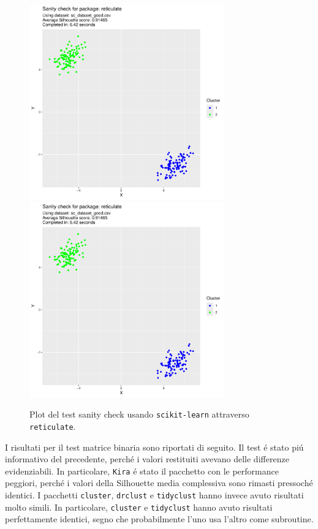 \documentclass[12pt]{report}
\begin{document}
			\begin{figure}[h]
				\centering
				\includegraphics[width = 0.75\textwidth, height = 0.45\textheight, page = 1]{results/results_RETICULATE.pdf}
				\includegraphics[width = 0.75\textwidth, height = 0.45\textheight, page = 2]{results/results_RETICULATE.pdf}
				\caption{Plot del test sanity check usando \texttt{scikit-learn} attraverso
				\texttt{reticulate}.}
				\label{fig:reticulate}
			\end{figure}

			I risultati per il test matrice binaria sono riportati
			di seguito. Il test é stato piú informativo del precedente,
			perché i valori restituiti avevano delle differenze
			evidenziabili. In particolare, \texttt{Kira} é stato il
			pacchetto con le performance peggiori, perché i valori
			della Silhouette media complessiva sono rimasti pressoché
			identici. I pacchetti \texttt{cluster}, \texttt{drclust}
			e \texttt{tidyclust} hanno invece avuto risultati molto
			simili. In particolare, \texttt{cluster} e \texttt{tidyclust}
			hanno avuto risultati perfettamente identici, segno che
			probabilmente l'uno usa l'altro come subroutine.
\end{document}
